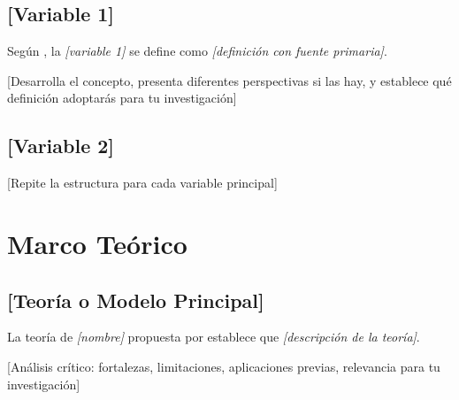 \subsection{[Variable 1]}
\label{subsec:variable1}

Según \cite{smith2023}, la \textit{[variable 1]} se define como \textit{[definición con fuente primaria]}. 


[Desarrolla el concepto, presenta diferentes perspectivas si las hay, y establece qué definición adoptarás para tu investigación]

\subsection{[Variable 2]}
\label{subsec:variable2}

[Repite la estructura para cada variable principal]

\section{Marco Teórico}
\label{sec:marco_teorico_principal}


\subsection{[Teoría o Modelo Principal]}
\label{subsec:teoria_principal}

La teoría de \textit{[nombre]} propuesta por \cite{bishop2006} establece que \textit{[descripción de la teoría]}.


[Análisis crítico: fortalezas, limitaciones, aplicaciones previas, relevancia para tu investigación]

